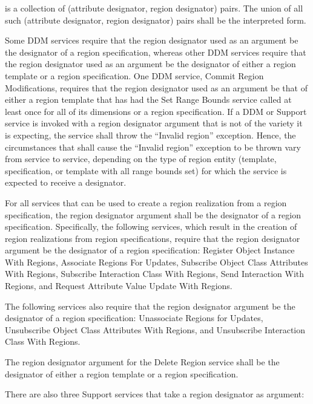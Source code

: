 \clearpage

\begin{compactstdpage}

    is a collection of (attribute designator, region designator) pairs. The union of all such (attribute designator, region designator) pairs shall be the interpreted form.

    Some DDM services require that the region designator used as an argument be the designator of a region specification, whereas other DDM services require that the region designator used as an argument be the designator of either a region template or a region specification. One DDM service, Commit Region Modifications, requires that the region designator used as an argument be that of either a region template that has had the Set Range Bounds service called at least once for all of its dimensions or a region specification. If a DDM or Support service is invoked with a region designator argument that is not of the variety it is expecting, the service shall throw the ``Invalid region'' exception. Hence, the circumstances that shall cause the ``Invalid region'' exception to be thrown vary from service to service, depending on the type of region entity (template, specification, or template with all range bounds set) for which the service is expected to receive a designator.

    For all services that can be used to create a region realization from a region specification, the region designator argument shall be the designator of a region specification. Specifically, the following services, which result in the creation of region realizations from region specifications, require that the region designator argument be the designator of a region specification: Register Object Instance With Regions, Associate Regions For Updates, Subscribe Object Class Attributes With Regions, Subscribe Interaction Class With Regions, Send Interaction With Regions, and Request Attribute Value Update With Regions.

    The following services also require that the region designator argument be the designator of a region specification: Unassociate Regions for Updates, Unsubscribe Object Class Attributes With Regions, and Unsubscribe Interaction Class With Regions.

    The region designator argument for the Delete Region service shall be the designator of either a region template or a region specification.

    There are also three Support services that take a region designator as argument:


\end{compactstdpage}
